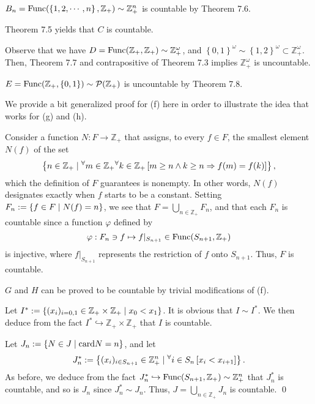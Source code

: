 \documentclass[a4paper,12pt]{article}
\begin{document}
\begin{sol}
	\( B_n = \mathrm{Func}(\left\{ 1,2,\cdots,n \right\},\mathbb{Z}_{+})
	\sim \mathbb{Z}_{+}^{n} \)
	is countable by Theorem 7.6.
	
	Theorem 7.5 yields that \( C \) is countable.
	
	Observe that we have
	\( D=\mathrm{Func}(\mathbb{Z}_{+},\mathbb{Z}_{+})\sim \mathbb{Z}_{+}^{\omega} \),
	and
	\( \left\{ 0,1 \right\}^{\omega} \sim \left\{ 1,2 \right\}^{\omega} \subset \mathbb{Z}_{+}^{\omega}\).
	Then, Theorem 7.7 and contrapositive of Theorem 7.3 implies
	\( \mathbb{Z}_{+}^{\omega} \) is uncountable.
	
	\( E = \mathrm{Func}(\mathbb{Z}_{+},\left\{ 0,1 \right\})
	\sim \mathcal{P}(\mathbb{Z}_{+}) \)
	is uncountable by Theorem 7.8.
	
	We provide a bit generalized proof for (f) here in order to illustrate the idea that works for (g) and (h).
	
	Consider a function
	\( N:F\to \mathbb{Z}_{+} \)
	that assigns, to every \( f\in F \), the smallest element \( N(f) \) of the set
	\begin{equation*}
		\left\{
		n \in \mathbb{Z}_{+} \;|\;
		{}^{\forall}  m \in \mathbb{Z}_{+}
		{}^{\forall}  k \in \mathbb{Z}_{+}
		\left[
			m\ge n \wedge k \ge n \Rightarrow f(m)=f(k) \right]
		\right\},
	\end{equation*}
	which the definition of \( F \) guarantees is nonempty.
	In other words, \( N(f)\) designates exactly when \( f \) starts to be a constant.
	Setting \( F_n:=\left\{ f\in F \;|\; N(f)=n \right\} \),
	we see that \( F= \bigcup_{n\in \mathbb{Z}_{+}}F_n \),
	and that each \( F_n \) is countable since a function \( \varphi \) defined by
	\begin{equation*}
		\varphi : F_n \ni f \mapsto f|_{S_{n+1}}
		\in \mathrm{Func}(S_{n+1},\mathbb{Z}_{+})
	\end{equation*}
	is injective, where
	\( f|_{S_{n+1}} \)
	represents the restriction of \( f \) onto \( S_{n+1} \).
	Thus, \( F \) is countable. 
	
	\( G \) and \( H \) can be proved to be countable by trivial modifications of (f).
	
	Let \( I^{\ast}:=\left\{ (x_i)_{i=0,1}\in \mathbb{Z}_{+} \times \mathbb{Z}_{+} \;|\; x_0 < x_1 \right\} \).
	It is obvious that \( I \sim I^{\ast} \).
	We then deduce from the fact 
	\( I^{\ast} \hookrightarrow \mathbb{Z}_{+} \times \mathbb{Z}_{+} \)
	that \( I \) is countable.
	
	Let \( J_n:=\left\{ N \in J \;|\; \mathrm{card}N = n \right\} \),
	and let
	\begin{equation*}
		J_n^{\ast}
		:=
		\left\{
		(x_i)_{i \in S_{n+1}}\in \mathbb{Z}_{+}^{n} \;|\;
		{}^{\forall}  i \in S_{n}\left[ x_i < x_{i+1} \right]
		\right\}.
	\end{equation*}
	As before, we deduce from the fact
	\( J_n^{\ast} \hookrightarrow
	\mathrm{Func}(S_{n+1},\mathbb{Z}_{+})\sim \mathbb{Z}_{+}^n \)
	that \( J_n^{\ast} \) is countable,
	and so is \( J_n \) since \( J_n^{\ast} \sim J_n \).
	Thus, \( J=\bigcup_{n\in \mathbb{Z}_{+}}J_n \)
	is countable.
	\qed\end{sol}
\end{document}
